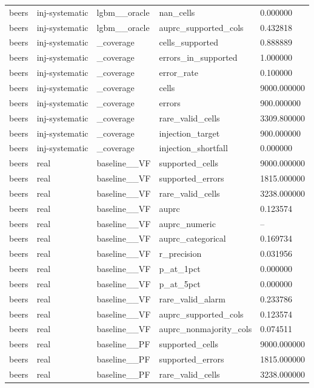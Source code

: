 \begin{tabular}{lllll}
beers & inj-systematic & lgbm\_\_oracle & nan\_cells & 0.000000 \\
beers & inj-systematic & lgbm\_\_oracle & auprc\_supported\_cols & 0.432818 \\
beers & inj-systematic & \_coverage & cells\_supported & 0.888889 \\
beers & inj-systematic & \_coverage & errors\_in\_supported & 1.000000 \\
beers & inj-systematic & \_coverage & error\_rate & 0.100000 \\
beers & inj-systematic & \_coverage & cells & 9000.000000 \\
beers & inj-systematic & \_coverage & errors & 900.000000 \\
beers & inj-systematic & \_coverage & rare\_valid\_cells & 3309.800000 \\
beers & inj-systematic & \_coverage & injection\_target & 900.000000 \\
beers & inj-systematic & \_coverage & injection\_shortfall & 0.000000 \\
beers & real & baseline\_\_VF & supported\_cells & 9000.000000 \\
beers & real & baseline\_\_VF & supported\_errors & 1815.000000 \\
beers & real & baseline\_\_VF & rare\_valid\_cells & 3238.000000 \\
beers & real & baseline\_\_VF & auprc & 0.123574 \\
beers & real & baseline\_\_VF & auprc\_numeric & -- \\
beers & real & baseline\_\_VF & auprc\_categorical & 0.169734 \\
beers & real & baseline\_\_VF & r\_precision & 0.031956 \\
beers & real & baseline\_\_VF & p\_at\_1pct & 0.000000 \\
beers & real & baseline\_\_VF & p\_at\_5pct & 0.000000 \\
beers & real & baseline\_\_VF & rare\_valid\_alarm & 0.233786 \\
beers & real & baseline\_\_VF & auprc\_supported\_cols & 0.123574 \\
beers & real & baseline\_\_VF & auprc\_nonmajority\_cols & 0.074511 \\
beers & real & baseline\_\_PF & supported\_cells & 9000.000000 \\
beers & real & baseline\_\_PF & supported\_errors & 1815.000000 \\
beers & real & baseline\_\_PF & rare\_valid\_cells & 3238.000000 \\

\end{tabular}
